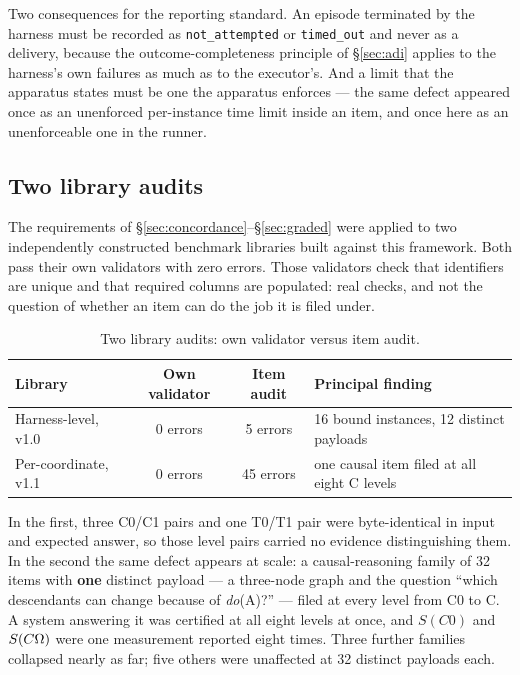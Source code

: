 Two consequences for the reporting standard. An episode terminated by the harness must be recorded as \texttt{not\_attempted} or \texttt{timed\_out} and never as a delivery, because the outcome-completeness principle of \S\ref{sec:adi} applies to the harness's own failures as much as to the executor's. And a limit that the apparatus states must be one the apparatus enforces --- the same defect appeared once as an unenforced per-instance time limit inside an item, and once here as an unenforceable one in the runner.

\subsection{Two library audits}\label{sec:libraries}

The requirements of \S\ref{sec:concordance}--\S\ref{sec:graded} were applied to two independently constructed benchmark libraries built against this framework. Both pass their own validators with zero errors. Those validators check that identifiers are unique and that required columns are populated: real checks, and not the question of whether an item can do the job it is filed under.

\begin{table}[!htbp]
\centering\small
\begin{tabularx}{\textwidth}{@{}lccY@{}}
\toprule
Library & Own validator & Item audit & Principal finding \\
\midrule
Harness-level, v1.0 & 0 errors & 5 errors & 16 bound instances, 12 distinct payloads \\
Per-coordinate, v1.1 & 0 errors & 45 errors & one causal item filed at all eight C levels \\
\bottomrule
\end{tabularx}
\caption{Two library audits: own validator versus item audit.}
\label{tab:libaudits}
\end{table}

In the first, three C0/C1 pairs and one T0/T1 pair were byte-identical in input and expected answer, so those level pairs carried no evidence distinguishing them. In the second the same defect appears at scale: a causal-reasoning family of 32 items with \textbf{one} distinct payload --- a three-node graph and the question ``which descendants can change because of \emph{do}(A)?'' --- filed at every level from C0 to C\Om{}. A system answering it was certified at all eight levels at once, and $S(C0)$ and $S(C\Omega{})$ were one measurement reported eight times. Three further families collapsed nearly as far; five others were unaffected at 32 distinct payloads each.

